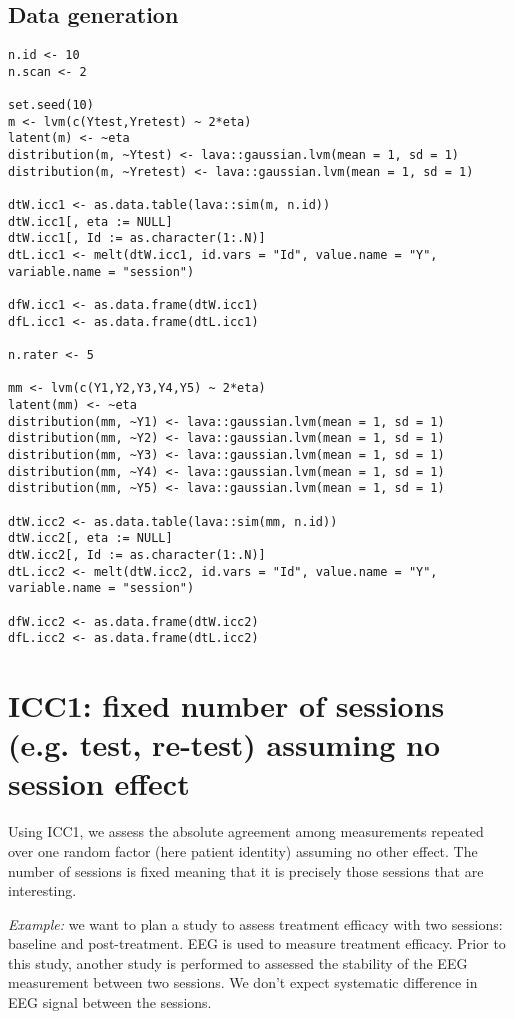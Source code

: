 \documentclass{article}
\begin{document}
\subsection{Data generation}
\label{sec:org77f573c}
\lstset{language=r,label= ,caption= ,captionpos=b,numbers=none}
\begin{lstlisting}
n.id <- 10
n.scan <- 2

set.seed(10)
m <- lvm(c(Ytest,Yretest) ~ 2*eta)
latent(m) <- ~eta
distribution(m, ~Ytest) <- lava::gaussian.lvm(mean = 1, sd = 1)
distribution(m, ~Yretest) <- lava::gaussian.lvm(mean = 1, sd = 1)

dtW.icc1 <- as.data.table(lava::sim(m, n.id))
dtW.icc1[, eta := NULL]
dtW.icc1[, Id := as.character(1:.N)]
dtL.icc1 <- melt(dtW.icc1, id.vars = "Id", value.name = "Y", variable.name = "session")

dfW.icc1 <- as.data.frame(dtW.icc1)
dfL.icc1 <- as.data.frame(dtL.icc1)

n.rater <- 5

mm <- lvm(c(Y1,Y2,Y3,Y4,Y5) ~ 2*eta)
latent(mm) <- ~eta
distribution(mm, ~Y1) <- lava::gaussian.lvm(mean = 1, sd = 1)
distribution(mm, ~Y2) <- lava::gaussian.lvm(mean = 1, sd = 1)
distribution(mm, ~Y3) <- lava::gaussian.lvm(mean = 1, sd = 1)
distribution(mm, ~Y4) <- lava::gaussian.lvm(mean = 1, sd = 1)
distribution(mm, ~Y5) <- lava::gaussian.lvm(mean = 1, sd = 1)

dtW.icc2 <- as.data.table(lava::sim(mm, n.id))
dtW.icc2[, eta := NULL]
dtW.icc2[, Id := as.character(1:.N)]
dtL.icc2 <- melt(dtW.icc2, id.vars = "Id", value.name = "Y", variable.name = "session")

dfW.icc2 <- as.data.frame(dtW.icc2)
dfL.icc2 <- as.data.frame(dtL.icc2)
\end{lstlisting}


\clearpage

\section{ICC1: fixed number of sessions (e.g. test, re-test) assuming no session effect}
\label{sec:org7a5f1c8}

Using ICC1, we assess the absolute agreement among measurements
repeated over one random factor (here patient identity) assuming no
other effect. The number of sessions is fixed meaning that it is
precisely those sessions that are interesting. 

\bigskip

\emph{Example:} we want to plan a study to assess treatment efficacy with
two sessions: baseline and post-treatment. EEG is used to measure
treatment efficacy. Prior to this study, another study is performed to
assessed the stability of the EEG measurement between two sessions. We
don't expect systematic difference in EEG signal between the sessions.
\end{document}

